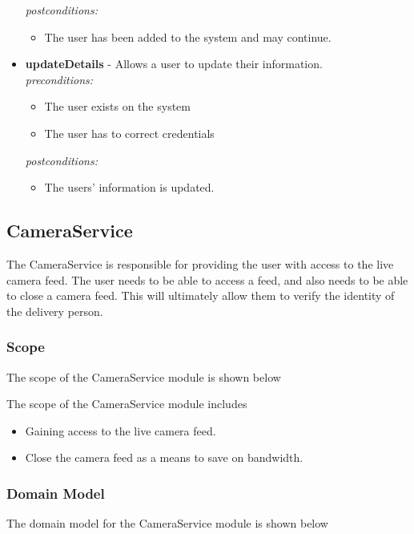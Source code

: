 \documentclass[a4paper,12pt]{article}
\begin{document}
\begin{itemize}
		\textit{postconditions:}
			\begin{itemize}
				\item The user has been added to the system and may continue.\\[0.5cm]
			\end{itemize}
			
		\item \textbf{updateDetails} - Allows a user to update their information.\\[0.5cm]
		\textit{preconditions:}
			\begin{itemize}
				\item The user exists on the system
				\item The user has to correct credentials
			\end{itemize}
		
		\textit{postconditions:}
			\begin{itemize}
				\item The users' information is updated.
			\end{itemize}
	\end{itemize}
	
	\newpage
	
	\subsection{CameraService}
	The CameraService is responsible for providing the user with access to the live camera feed. The user needs to be able to access a feed, and also needs to be able to close a camera feed. This will ultimately allow them to verify the identity of the delivery person. 
	
	\subsubsection{Scope}
	The scope of the CameraService module is shown below
	
	
	{\noindent}The scope of the CameraService module includes
	\begin{itemize}
		\item Gaining access to the live camera feed.
		\item Close the camera feed as a means to save on bandwidth.
	\end{itemize}
	
	\subsubsection{Domain Model}
	The domain model for the CameraService module is shown below
	
\end{document}
